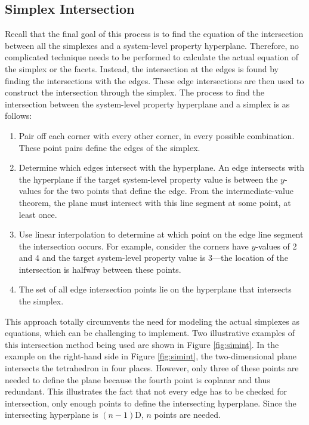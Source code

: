 \subsection{Simplex Intersection}
Recall that the final goal of this process is to find the equation of the intersection between all the simplexes and a system-level property hyperplane.
Therefore, no complicated technique needs to be performed to calculate the actual equation of the simplex or the facets.
Instead, the intersection at the edges is found by finding the intersections with the edges.
These edge intersections are then used to construct the intersection through the simplex.
The process to find the intersection between the system-level property hyperplane and a simplex is as follows:
\begin{enumerate}
   \item Pair off each corner with every other corner, in every possible combination. These point pairs define the edges of the simplex.
   \item Determine which edges intersect with the hyperplane. An edge intersects with the hyperplane if the target system-level property value  is between the $y$-values for the two points that define the edge. From the intermediate-value theorem, the plane must intersect with this line segment at some point, at least once.
   \item Use linear interpolation to determine at which point on the edge line segment the intersection occurs. For example, consider the corners have $y$-values of 2 and 4 and the target system-level property value is 3---the location of the intersection is halfway between these points.
   \item The set of all edge intersection points lie on the hyperplane that intersects the simplex.
\end{enumerate}
This approach totally circumvents the need for modeling the actual simplexes as equations, which can be challenging to implement.
Two illustrative examples of this intersection method being used are shown in Figure \ref{fig:simint}.
In the example on the right-hand side in Figure \ref{fig:simint}, the two-dimensional plane intersects the tetrahedron in four places.
However, only three of these points are needed to define the plane because the fourth point is coplanar and thus redundant.
This illustrates the fact that not every edge has to be checked for intersection, only enough points to define the intersecting hyperplane.
Since the intersecting hyperplane is $(n-1)$D, $n$ points are needed.

